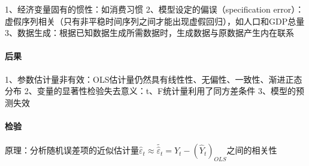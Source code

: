 \documentclass[12pt]{book}
\begin{document}
1、经济变量固有的惯性：如消费习惯  
2、模型设定的偏误（specification error）：虚假序列相关（只有非平稳时间序列之间才能出现虚假回归），如人口和GDP总量  
3、数据生成：根据已知数据生成所需数据时，生成数据与原数据产生内在联系

\paragraph{后果}

1、参数估计量非有效：OLS估计量仍然具有线性性、无偏性、一致性、渐进正态分布  
2、变量的显著性检验失去意义：t、F统计量利用了同方差条件  
3、模型的预测失效

\paragraph{检验}

原理：分析随机误差项的近似估计量${\hat{\varepsilon}}_t\approx\widetilde{{\hat{\varepsilon}}_t}=Y_t-\left({\hat{Y}}_t\right)_{OLS}$之间的相关性
\end{document}
